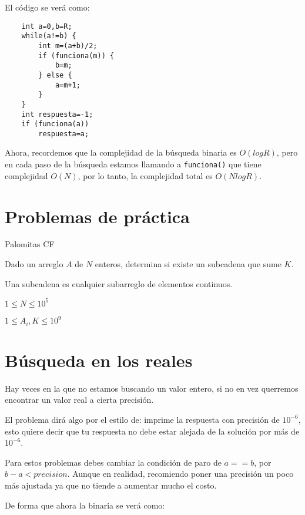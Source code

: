 El código se verá como:

\begin{lstlisting}
	int a=0,b=R;
	while(a!=b) {
		int m=(a+b)/2;
		if (funciona(m)) {
			b=m;
		} else {
			a=m+1;
		}
	}
	int respuesta=-1;
	if (funciona(a))
		respuesta=a;
\end{lstlisting}

Ahora, recordemos que la complejidad de la búsqueda binaria es \(O(logR)\), pero en cada paso de la búsqueda estamos llamando a \verb|funciona()| que tiene complejidad \(O(N)\), por lo tanto, la complejidad total es \(O(NlogR)\).

\section*{Problemas de práctica}

\problemtitle Palomitas CF\\

\problembreak

\problemtitle Dado un arreglo \(A\) de \(N\) enteros, determina si existe un subcadena que sume \(K\).

Una subcadena es cualquier subarreglo de elementos continuos.
\begin{plimits}
	\item \(1\leq N \leq 10^5\)
	\item \(1\leq A_i, K \leq 10^9\)
\end{plimits}


\newpage
\section*{Búsqueda en los reales}

Hay veces en la que no estamos buscando un valor entero, si no en vez querremos encontrar un valor real a cierta precisión.

El problema dirá algo por el estilo de: imprime la respuesta con precisión de \(10^{-6}\), esto quiere decir que tu respuesta no debe estar alejada de la solución por más de \(10^{-6}\).

Para estos problemas debes cambiar la condición de paro de \(a==b\), por \(b-a < precision\). Aunque en realidad, recomiendo poner una precisión un poco más ajustada ya que no tiende a aumentar mucho el costo.

De forma que ahora la binaria se verá como:

